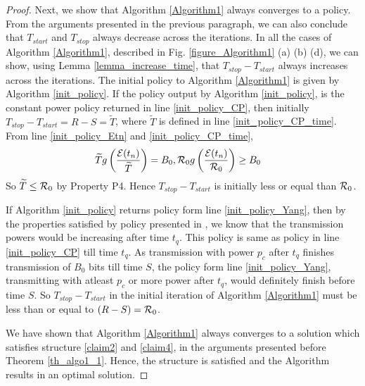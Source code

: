 \begin{proof}
Next, we show that Algorithm \ref{Algorithm1} always converges to a policy. From the arguments presented in the previous paragraph, we can also conclude that $T_{start}$ and $T_{stop}$ always decrease across the iterations. In all the cases of Algorithm \ref{Algorithm1}, described in Fig. \ref{figure_Algorithm1} (a) (b) (d), we can show, using Lemma \ref{lemma_increase_time}, that $T_{stop}-T_{start}$ always increases across the iterations. The initial policy to Algorithm \ref{Algorithm1} is given by Algorithm \ref{init_policy}. If the policy output by Algorithm \ref{init_policy}, is the constant power policy returned in line \ref{init_policy_CP}, then initially $T_{stop}-T_{start}=R-S=\widetilde{T}$, where $\widetilde{T}$ is defined in line \ref{init_policy_CP_time}. From line \ref{init_policy_Etn} and \ref{init_policy_CP_time}, 
\begin{align}
& \widetilde{T}g\left(\dfrac{\mathcal{E}(t_n)}{\widetilde{T}}\right) = B_0, \mathcal{R}_0g\left(\dfrac{\mathcal{E}(t_n)}{\mathcal{R}_0}\right) \ge B_0
\end{align}    
So $\widetilde{T}\le \mathcal{R}_0$ by Property P4. Hence $T_{stop}-T_{start}$ is initially less or equal than $\mathcal{R}_0$.

If Algorithm \ref{init_policy} returns policy form line \ref{init_policy_Yang}, then by the properties satisfied by policy presented in \cite{Yang}, we know that the transmission powers would be increasing after time $t_q$. This policy is same as policy in line \ref{init_policy_CP} till time $t_q$. As transmission with power $p_c$ after $t_q$ finishes transmission of $B_0$ bits till time $S$, the policy form line \ref{init_policy_Yang}, transmitting with atleast $p_c$ or more power after $t_q$, would definitely finish before time $S$. So $T_{stop}-T_{start}$ in the initial iteration of Algorithm \ref{Algorithm1} must be less than or equal to $(R-S)=\mathcal{R}_0$.

 
We have shown that Algorithm \ref{Algorithm1} always converges to a solution which satisfies structure \eqref{claim2} and \eqref{claim4}, in the arguments presented before Theorem \ref{th_algo1_1}. Hence, the structure is satisfied and the Algorithm results in an optimal solution.


\end{proof}
